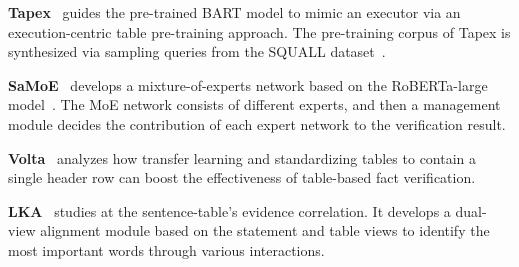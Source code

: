 \documentclass[11pt]{article}
\newcommand{\term}[1]{\xspace}
\newcommand{\sstab}{\vspace{0.2ex}\noindent}
\begin{document}
\sstab
{\bf Tapex}~\cite{tapex} guides the pre-trained BART model to mimic an \term{SQL} executor via an execution-centric table pre-training approach. The pre-training corpus of Tapex is synthesized via sampling \term{SQL} queries from the SQUALL dataset~\cite{squall}.

\sstab
{\bf SaMoE}~\cite{SaMoE} develops a mixture-of-experts network based on the RoBERTa-large model~\cite{roberta}. The MoE network consists of different experts, and then a management module decides the contribution of each expert network to the verification result. 

\sstab
{\bf Volta}~\cite{volta} analyzes how transfer learning and standardizing tables to contain a single header row can boost the effectiveness of table-based fact verification.

\sstab
{\bf LKA}~\cite{lka} studies at the sentence-table's evidence correlation. It develops a dual-view alignment module based on the statement and table views to identify the most important words through various interactions.
\fi 
\end{document}
